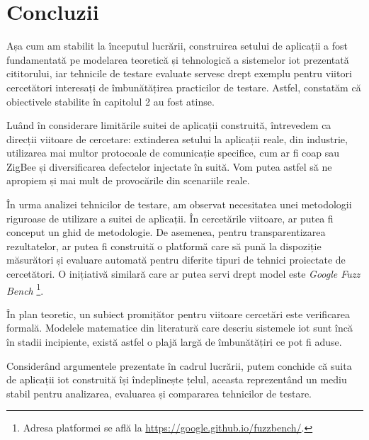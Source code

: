 \chapter{Concluzii}

Așa cum am stabilit la începutul lucrării, construirea setului de aplicații a fost fundamentată pe modelarea teoretică și tehnologică a sistemelor \acrshort{iot} prezentată cititorului, iar tehnicile de testare evaluate servesc drept exemplu pentru viitori cercetători interesați de îmbunătățirea practicilor de testare. Astfel, constatăm că obiectivele stabilite în capitolul 2 au fost atinse.

Luând în considerare limitările suitei de aplicații construită, întrevedem ca direcții viitoare de cercetare: extinderea setului la aplicații reale, din industrie, utilizarea mai multor protocoale de comunicație specifice, cum ar fi \acrshort{coap} sau ZigBee și diversificarea defectelor injectate în suită. Vom putea astfel să ne apropiem și mai mult de provocările din scenariile reale.

În urma analizei tehnicilor de testare, am observat necesitatea unei metodologii riguroase de utilizare a suitei de aplicații. În cercetările viitoare, ar putea fi conceput un ghid de metodologie. De asemenea, pentru transparentizarea rezultatelor, ar putea fi construită o platformă care să pună la dispoziție măsurători și evaluare automată pentru diferite tipuri de tehnici proiectate de cercetători. O inițiativă similară care ar putea servi drept model este \textit{Google Fuzz Bench} \footnote{Adresa platformei se află la \url{https://google.github.io/fuzzbench/}.}.

În plan teoretic, un subiect promițător pentru viitoare cercetări este verificarea formală. Modelele matematice din literatură care descriu sistemele \acrshort{iot} sunt încă în stadii incipiente, există astfel o plajă largă de îmbunătățiri ce pot fi aduse. 

Considerând argumentele prezentate în cadrul lucrării, putem conchide că suita de aplicații \acrlong{iot} construită își îndeplinește țelul, aceasta reprezentând un mediu stabil pentru analizarea, evaluarea și compararea tehnicilor de testare. 